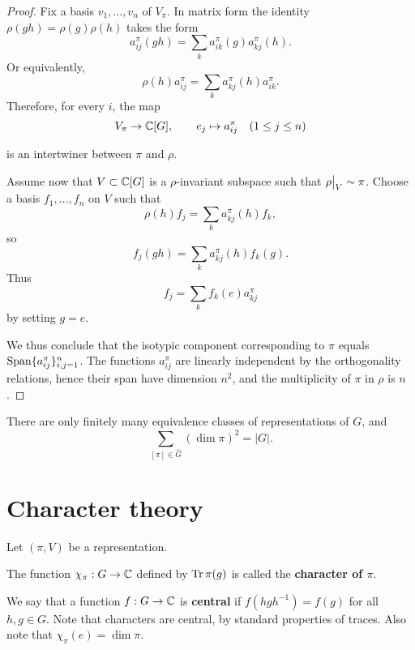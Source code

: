 \documentclass[11pt, english]{article}
\begin{document}
\begin{proof}
Fix a basis $v_1,\ldots,v_n$ of $V_\pi$. In matrix form the identity $\rho(gh)=\rho(g)\rho(h)$ takes the form 
$$
a_{ij}^\pi(gh) = \sum_k a_{ik}^\pi(g) a_{kj}^\pi (h). 
$$
Or equivalently,
$$
\rho(h) a_{ij}^\pi  = 	\sum_k a_{kj}^\pi (h) a_{ik}^\pi.
$$
Therefore, for every $i$, the map 
$$
V_\pi \to \mathbb{C}[G], \qquad e_j \mapsto a_{ij}^\pi  \quad (1 \leq j \leq n)
$$

is an intertwiner between $\pi$ and $\rho$.

Assume now that $V \subset \mathbb{C}[G]$ is a $\rho$-invariant subspace such that $\restr{\rho}{V} \sim \pi$. Choose a basis $f_1,\ldots, f_n$ on $V$ such that 
$$
\rho(h) f_j = \sum_k a_{kj}^\pi(h) f_k,
$$
so 
$$
f_j(gh) = \sum_k a_{kj}^\pi(h) f_k(g).
$$
Thus
$$
f_j = \sum_k f_k(e) a_{kj}^\pi
$$
by setting $g=e$.

We thus conclude that the isotypic component corresponding to $\pi$ equals $\operatorname{Span} \{ a_{ij}^\pi \}_{i,j=1}^n$. The functions $a_{ij}^\pi$ are linearly independent by the orthogonality relations, hence their span have dimension $n^2$, and the multiplicity of $\pi$ in $\rho$ is $n$.
\end{proof}

\begin{corr}
There are only finitely many equivalence classes of representations of $G$, and 
$$
\sum_{[\pi] \in \widehat G} (\dim \pi )^2 = \lvert G \rvert.
$$
\end{corr}



\newpage
\section{Character theory}

Let $(\pi,V)$ be a representation. 

The function $\chi_\pi:G \to \mathbb{C}$ defined by $\operatorname{Tr} \pi(g)$ is called the \textbf{character of $\pi$}.

We say that a function $f:G \to \mathbb{C}$ is \textbf{central} if $f(hgh^{-1})=f(g)$ for all $h,g \in G$. Note that characters are central, by standard properties of traces. Also note that $\chi_\pi(e)=\dim \pi$. 
\end{document}
